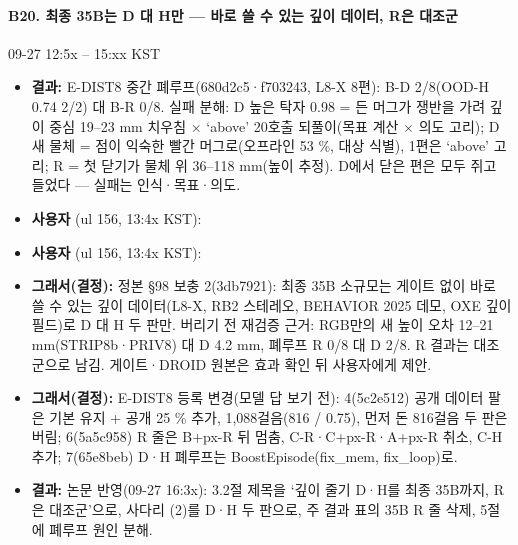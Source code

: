 \paragraph{B20. 최종 35B는 D 대 H만 --- 바로 쓸 수 있는 깊이 데이터, R은 대조군}
{\small 09-27 12:5x -- 15:xx KST}
\begin{itemize}
  \item \textbf{결과:} E-DIST8 중간 폐루프(680d2c5·f703243, L8-X 8편): B-D 2/8(OOD-H 0.74 2/2) 대 B-R 0/8. 실패 분해: D 높은 탁자 0.98 = 든 머그가 쟁반을 가려 깊이 중심 19--23 mm 치우침 $\times$ `above' 20호출 되풀이(목표 계산 $\times$ 의도 고리); D 새 물체 = 점이 익숙한 빨간 머그로(오프라인 53 \%, 대상 식별), 1편은 `above' 고리; R = 첫 닫기가 물체 위 36--118 mm(높이 추정). D에서 닫은 편은 모두 쥐고 들었다 --- 실패는 인식·목표·의도.
  \item \textbf{사용자} (ul 156, 13:4x KST): 
  \item \textbf{사용자} (ul 156, 13:4x KST): 
  \item \textbf{그래서(결정):} 정본 §98 보충 2(3db7921): 최종 35B 소규모는 게이트 없이 바로 쓸 수 있는 깊이 데이터(L8-X, RB2 스테레오, BEHAVIOR 2025 데모, OXE 깊이 필드)로 D 대 H 두 판만. 버리기 전 재검증 근거: RGB만의 새 높이 오차 12--21 mm(STRIP8b·PRIV8) 대 D 4.2 mm, 폐루프 R 0/8 대 D 2/8. R 결과는 대조군으로 남김. 게이트·DROID 원본은 효과 확인 뒤 사용자에게 제안.
  \item \textbf{그래서(결정):} E-DIST8 등록 변경(모델 답 보기 전): 4(5c2e512) 공개 데이터 팔은 기본 유지 + 공개 25 \% 추가, 1,088걸음(816 / 0.75), 먼저 돈 816걸음 두 판은 버림; 6(5a5c958) R 줄은 B+px-R 뒤 멈춤, C-R·C+px-R·A+px-R 취소, C-H 추가; 7(65e8beb) D·H 폐루프는 BoostEpisode(fix\_mem, fix\_loop)로.
  \item \textbf{결과:} 논문 반영(09-27 16:3x): 3.2절 제목을 `깊이 줄기 D·H를 최종 35B까지, R은 대조군'으로, 사다리 (2)를 D·H 두 판으로, 주 결과 표의 35B R 줄 삭제, 5절에 폐루프 원인 분해.
\end{itemize}

